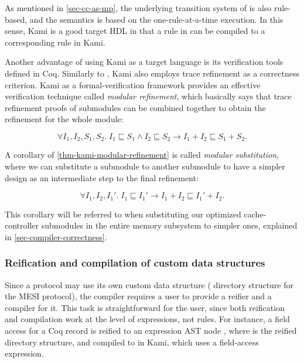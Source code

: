 As mentioned in \autoref{sec-cc-as-mp}, the underlying transition system of \hemiola{} is also rule-based, and the semantics is based on the one-rule-at-a-time execution.
In this sense, Kami is a good target HDL in that a rule in \hemiola{} can be compiled to a corresponding rule in Kami.

Another advantage of using Kami as a target language is its verification tools defined in Coq.
Similarly to \hemiola{}, Kami also employs trace refinement as a correctness criterion.
Kami as a formal-verification framework provides an effective verification technique called \emph{modular refinement}, which basically says that trace refinement proofs of submodules can be combined together to obtain the refinement for the whole module:
\begin{theorem}
  \label{thm-kami-modular-refinement}
  \begin{displaymath}
    \forall I_1, I_2, S_1, S_2.\; I_1 \sqsubseteq S_1 \wedge I_2 \sqsubseteq S_2 \to I_1 + I_2 \sqsubseteq S_1 + S_2.
  \end{displaymath}
\end{theorem}

A corollary of \autoref{thm-kami-modular-refinement} is called \emph{modular substitution}, where we can substitute a submodule to another submodule to have a simpler design as an intermediate step to the final refinement:
\begin{theorem}
  \label{thm-kami-modular-subst}
  \begin{displaymath}
    \forall I_1, I_2, I_1'.\; I_1 \sqsubseteq I_1' \to I_1 + I_2 \sqsubseteq I_1' + I_2.
  \end{displaymath}
\end{theorem}
This corollary will be referred to when substituting our optimized cache-controller submodules in the entire memory subsystem to simpler ones, explained in \autoref{sec-compiler-correctness}.

\subsubsection{Reification and compilation of custom data structures}

Since a \hemiola{} protocol may use its own custom data structure (\eg{} directory structure for the MESI protocol), the compiler requires a user to provide a reifier and a compiler for it.
This task is straightforward for the user, since both reification and compilation work at the level of expressions, not rules.
For instance, a field access  for a Coq record  is reified to an expression AST node , where  is the reified directory structure, and compiled to  in Kami, which uses a field-access expression.

